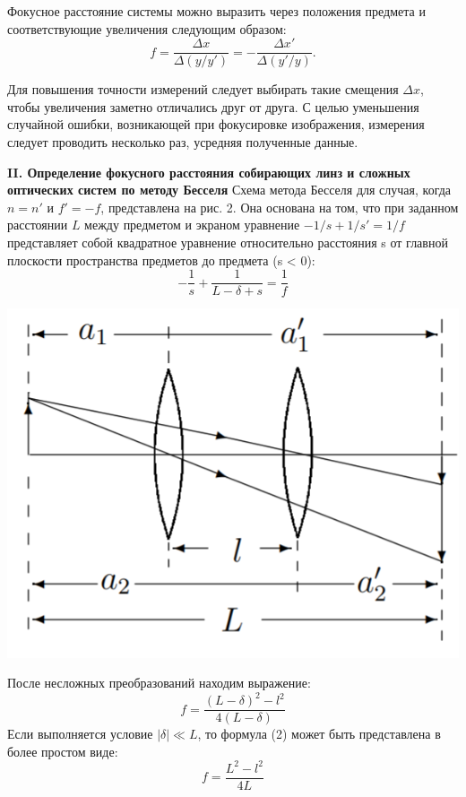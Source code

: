 \documentclass[a4paper,12pt]{report}
\begin{document}
Фокусное расстояние системы можно выразить через положения предмета и соответствующие увеличения следующим образом:
\begin{equation}
    f = \frac{\Delta x}{\Delta(y/y')} = - \frac{\Delta x'}{\Delta(y'/y)}. 
\end{equation}

Для повышения точности измерений следует выбирать такие смещения $\Delta x$, чтобы увеличения заметно
отличались друг от друга. С целью уменьшения случайной ошибки,
возникающей при фокусировке изображения, измерения следует проводить несколько раз, усредняя полученные данные.

\newpage
\noindent\textbf{II. Определение фокусного расстояния собирающих линз и сложных
оптических систем по методу Бесселя}
Схема метода Бесселя для случая, когда $n = n'$ и $f' = -f$, представлена на рис. 2. Она основана на том, что при заданном расстоянии $L$ между предметом и экраном уравнение $-1/s + 1/s' = 1/f$  представляет собой квадратное уравнение относительно расстояния s от главной плоскости пространства предметов до предмета (s < 0):
\begin{equation*}
    -\frac{1}{s} + \frac{1}{L-\delta+s} = \frac{1}{f}
\end{equation*}


\begin{center}
    \includegraphics[scale = 0.5]{pic2.PNG}
\end{center}

После несложных преобразований находим выражение: 
\begin{equation}
    f = \frac{(L - \delta)^{2} - l^{2}}{4(L - \delta)}
\end{equation}
Если выполняется условие $|\delta| \ll L$, то формула (2) может быть представлена в более простом виде:
\begin{equation}
    f = \frac{L^{2} - l^{2}}{4L}
\end{equation}
\end{document}
